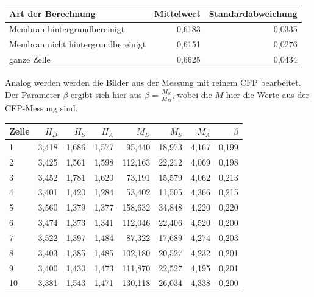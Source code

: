 \begin{center}
    \centering
    \begin{tabular}{lrr}
        Art der Berechnung & Mittelwert & Standardabweichung \\
        \hline
        Membran hintergrundbereinigt & 0,6183 & 0,0335 \\
        Membran nicht hintergrundbereinigt & 0,6151 & 0,0276 \\
        ganze Zelle & 0,6625 & 0,0434 \\
        
    \end{tabular}
\end{center}
\label{tab:gamma}




Analog werden werden die Bilder aus der Messung mit reinem CFP bearbeitet. Der Parameter $\beta$ ergibt sich hier aus 
$\beta = \frac{M_S}{M_D}$, wobei die $M$ hier die Werte aus der CFP-Messung sind.


\begin{center}
    \centering
    \begin{tabular}{lrrrrrrr}
        \toprule
        Zelle &  $H_D$ &  $H_S$ &  $H_A$ &    $M_D$ &   $M_S$ &  $M_A$ &  $\beta$ \\
        \midrule
        1     & 3,418 & 1,686 & 1,577 &  95,440 & 18,973 & 4,167 & 0,199 \\
        2     & 3,425 & 1,561 & 1,598 & 112,163 & 22,212 & 4,069 & 0,198 \\
        3     & 3,452 & 1,781 & 1,620 &  73,191 & 15,579 & 4,062 & 0,213 \\
        4     & 3,401 & 1,420 & 1,284 &  53,402 & 11,505 & 4,366 & 0,215 \\
        5     & 3,560 & 1,379 & 1,377 & 158,632 & 34,848 & 4,220 & 0,220 \\
        6     & 3,474 & 1,373 & 1,341 & 112,046 & 22,406 & 4,520 & 0,200 \\
        7     & 3,522 & 1,397 & 1,484 &  87,322 & 17,689 & 4,274 & 0,203 \\
        8     & 3,403 & 1,385 & 1,485 & 102,180 & 20,527 & 4,232 & 0,201 \\
        9     & 3,400 & 1,430 & 1,473 & 111,870 & 22,527 & 4,195 & 0,201 \\
        10    & 3,381 & 1,543 & 1,471 & 130,118 & 26,034 & 4,338 & 0,200 \\
        \bottomrule
    \end{tabular}
    \label{tab:CFP}
\end{center}

